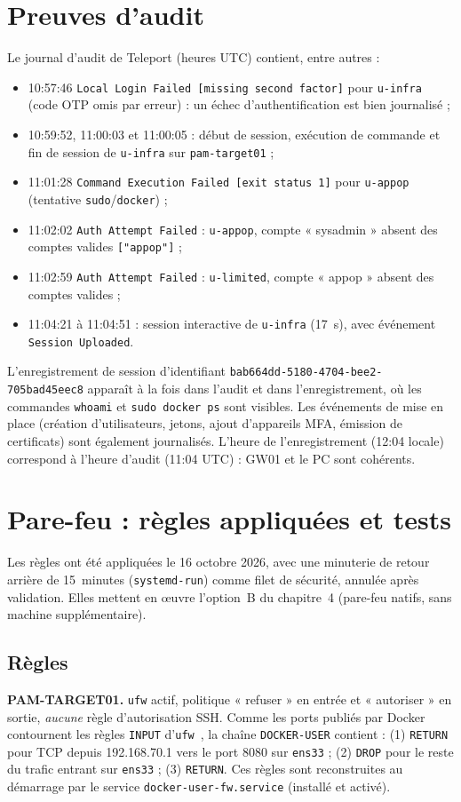 \documentclass[11pt,a4paper]{report}
\begin{document}
\section{Preuves d'audit}
Le journal d'audit de Teleport (heures UTC) contient, entre autres :
\begin{itemize}
\item 10:57:46 \texttt{Local Login Failed [missing second factor]} pour \texttt{u-infra} (code OTP omis par erreur) : un échec d'authentification est bien journalisé ;
\item 10:59:52, 11:00:03 et 11:00:05 : début de session, exécution de commande et fin de session de \texttt{u-infra} sur \texttt{pam-target01} ;
\item 11:01:28 \texttt{Command Execution Failed [exit status 1]} pour \texttt{u-appop} (tentative \texttt{sudo}/\texttt{docker}) ;
\item 11:02:02 \texttt{Auth Attempt Failed} : \texttt{u-appop}, compte « sysadmin » absent des comptes valides \texttt{["appop"]} ;
\item 11:02:59 \texttt{Auth Attempt Failed} : \texttt{u-limited}, compte « appop » absent des comptes valides ;
\item 11:04:21 à 11:04:51 : session interactive de \texttt{u-infra} (17~s), avec événement \texttt{Session Uploaded}.
\end{itemize}
L'enregistrement de session d'identifiant \texttt{bab664dd-5180-4704-bee2-705bad45eec8} apparaît à la fois dans l'audit et dans l'enregistrement, où les commandes \texttt{whoami} et \texttt{sudo docker ps} sont visibles. Les événements de mise en place (création d'utilisateurs, jetons, ajout d'appareils MFA, émission de certificats) sont également journalisés. L'heure de l'enregistrement (12:04 locale) correspond à l'heure d'audit (11:04 UTC) : GW01 et le PC sont cohérents.

\section{Pare-feu : règles appliquées et tests}
Les règles ont été appliquées le 16 octobre 2026, avec une minuterie de retour arrière de 15~minutes (\texttt{systemd-run}) comme filet de sécurité, annulée après validation. Elles mettent en œuvre l'option~B du chapitre~4 (pare-feu natifs, sans machine supplémentaire).

\subsection{Règles}
\textbf{PAM-TARGET01.} \texttt{ufw} actif, politique « refuser » en entrée et « autoriser » en sortie, \emph{aucune} règle d'autorisation SSH. Comme les ports publiés par Docker contournent les règles \texttt{INPUT} d'\texttt{ufw}~\cite{docker-fw}, la chaîne \texttt{DOCKER-USER} contient : (1) \texttt{RETURN} pour TCP depuis 192.168.70.1 vers le port 8080 sur \texttt{ens33} ; (2) \texttt{DROP} pour le reste du trafic entrant sur \texttt{ens33} ; (3) \texttt{RETURN}. Ces règles sont reconstruites au démarrage par le service \texttt{docker-user-fw.service} (installé et activé).
\end{document}
